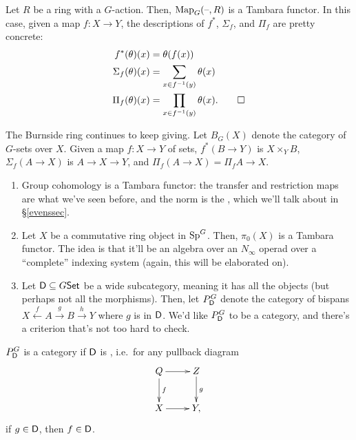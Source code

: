 \begin{exm}
Let $R$ be a ring with a $G$-action. Then, $\operatorname{Map}_G(\text{--},R)$ is a Tambara functor. In this case, given a map $f\colon
X\to Y$, the descriptions of $f^*$, $\Sigma_f$, and $\Pi_f$ are pretty concrete:
\begin{align*}
	f^*(\theta)(x) &= \theta(f(x))\\
	\Sigma_f(\theta)(x) &= \sum_{x\in f^{-1}(y)} \theta(x)\\
	\Pi_f(\theta)(x) &= \prod_{x\in f^{-1}(y)} \theta(x).\qedhere
\end{align*}
\end{exm}
\begin{exm}
The Burnside ring continues to keep giving. Let $B_G(X)$ denote the category of $G$-sets over $X$. Given a map
$f\colon X\to Y$ of sets, $f^*(B\to Y)$ is $X\times_Y B$, $\Sigma_f(A\to X)$ is $A\to X\to Y$, and $\Pi_f(A\to X) =
\Pi_fA\to X$.
\end{exm}
\begin{exm}\hfill
\label{Evensexm}
\begin{enumerate}
	\item Group cohomology is a Tambara functor: the transfer and restriction maps are what we've seen before, and
	the norm is the , which we'll talk about in \S\ref{evenssec}.
	\item Let $X$ be a commutative ring object in $\mathrm{Sp}^G$. Then, $\pi_0(X)$ is a Tambara functor. The idea is that
	it'll be an algebra over an $N_\infty$ operad over a ``complete'' indexing system (again, this will be
	elaborated on).
	\item Let $\mathsf D\subseteq G\mathsf{Set}$ be a wide subcategory, meaning it has all the objects (but perhaps not all the
	morphisms). Then, let $P_\mathsf D^G$ denote the category of bispans $X\stackrel f\gets A\stackrel g\to B\stackrel
	h\to Y$ where $g$ is in $\mathsf D$. We'd like $P_\mathsf D^G$ to be a category, and there's a criterion that's not too
	hard to check.\qedhere
\end{enumerate}
\end{exm}
\begin{prop}
$P_\mathsf D^G$ is a category if $\mathsf D$ is , i.e.\ for any pullback diagram
\[\xymatrix{
	Q\ar[r]\ar[d]^f & Z\ar[d]^g\\
	X\ar[r] & Y,
}\]
if $g\in\mathsf D$, then $f\in\mathsf D$.
\end{prop}
